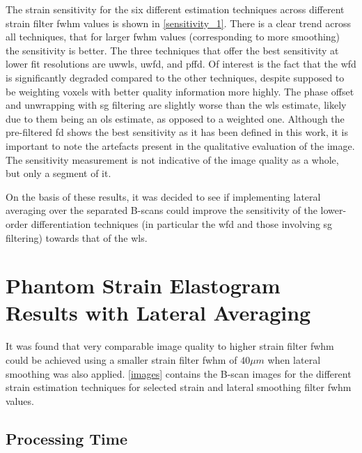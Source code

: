 The strain sensitivity for the six different estimation techniques across different strain filter \ac{fwhm} values is shown in \autoref{sensitivity_1}. There is a clear trend across all techniques, that for larger \ac{fwhm} values (corresponding to more smoothing) the sensitivity is better. 
The three techniques that offer the best sensitivity at lower fit resolutions are \ac{uwwls}, \ac{uwfd}, and \ac{pffd}. Of interest is the fact that the \ac{wfd} is significantly degraded compared to the other techniques, despite supposed to be weighting voxels with better quality information more highly.
The phase offset and unwrapping with \ac{sg} filtering are slightly worse than the \ac{wls} estimate, likely due to them being an \ac{ols} estimate, as opposed to a weighted one.
Although the pre-filtered \ac{fd} shows the best sensitivity as it has been defined in this work, it is important to note the artefacts present in the qualitative evaluation of the image. The sensitivity measurement is not indicative of the image quality as a whole, but only a segment of it.

On the basis of these results, it was decided to see if implementing lateral averaging over the separated B-scans could improve the sensitivity of the lower-order differentiation techniques (in particular the \ac{wfd} and those involving \ac{sg} filtering) towards that of the \ac{wls}. 

\section{Phantom Strain Elastogram Results with Lateral Averaging}\label{phantom_results_lateral}

It was found that very comparable image quality to higher strain filter \ac{fwhm} could be achieved using a smaller strain filter \ac{fwhm} of $40\mu m$ when lateral smoothing was also applied. \autoref{images} contains the B-scan  images for the different strain estimation techniques for selected strain and lateral smoothing filter \ac{fwhm} values. 

\subsection{Processing Time}

